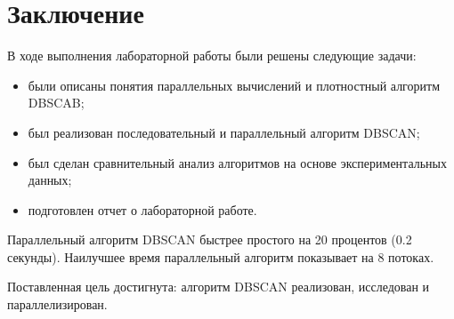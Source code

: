 \chapter*{Заключение}

В ходе выполнения лабораторной работы были решены следующие задачи:

\begin{itemize}
	\item были описаны понятия параллельных вычислений и плотностный алгоритм DBSCAB;
	
	\item был реализован последовательный и параллельный алгоритм DBSCAN;
	\item был сделан сравнительный анализ алгоритмов на основе экспериментальных данных;
	
	\item подготовлен отчет о лабораторной работе.
\end{itemize}

Параллельный алгоритм DBSCAN быстрее простого на 20 процентов (0.2 секунды).
Наилучшее время параллельный алгоритм показывает на 8 потоках.  

Поставленная цель достигнута: алгоритм DBSCAN реализован, исследован и параллелизирован.